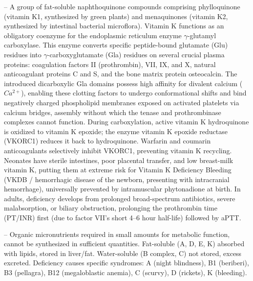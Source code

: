 -- A group of fat-soluble naphthoquinone compounds comprising phylloquinone (vitamin K1, synthesized by green plants) and menaquinones (vitamin K2, synthesized by intestinal bacterial microflora). Vitamin K functions as an obligatory coenzyme for the endoplasmic reticulum enzyme $\gamma$-glutamyl carboxylase. This enzyme converts specific peptide-bound glutamate (Glu) residues into $\gamma$-carboxyglutamate (Gla) residues on several crucial plasma proteins: coagulation factors II (prothrombin), VII, IX, and X, natural anticoagulant proteins C and S, and the bone matrix protein osteocalcin. The introduced dicarboxylic Gla domains possess high affinity for divalent calcium ($Ca^{2+}$), enabling these clotting factors to undergo conformational shifts and bind negatively charged phospholipid membranes exposed on activated platelets via calcium bridges, assembly without which the tenase and prothrombinase complexes cannot function. During carboxylation, active vitamin K hydroquinone is oxidized to vitamin K epoxide; the enzyme vitamin K epoxide reductase (VKORC1) reduces it back to hydroquinone. Warfarin and coumarin anticoagulants selectively inhibit VKORC1, preventing vitamin K recycling. Neonates have sterile intestines, poor placental transfer, and low breast-milk vitamin K, putting them at extreme risk for Vitamin K Deficiency Bleeding (VKDB / hemorrhagic disease of the newborn, presenting with intracranial hemorrhage), universally prevented by intramuscular phytonadione at birth. In adults, deficiency develops from prolonged broad-spectrum antibiotics, severe malabsorption, or biliary obstruction, prolonging the prothrombin time (PT/INR) first (due to factor VII's short 4--6 hour half-life) followed by aPTT.

-- Organic micronutrients required in small amounts for metabolic function, cannot be synthesized in sufficient quantities. Fat-soluble (A, D, E, K) absorbed with lipids, stored in liver/fat. Water-soluble (B complex, C) not stored, excess excreted. Deficiency causes specific syndromes: A (night blindness), B1 (beriberi), B3 (pellagra), B12 (megaloblastic anemia), C (scurvy), D (rickets), K (bleeding).

